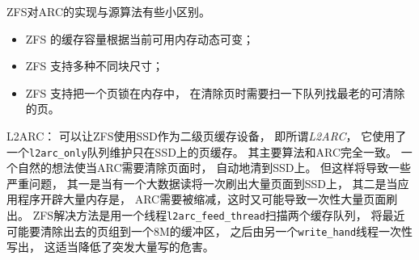 ZFS对ARC的实现与源算法有些小区别。
\begin{itemize}
  \item ZFS 的缓存容量根据当前可用内存动态可变；
  \item ZFS 支持多种不同块尺寸；
  \item ZFS 支持把一个页锁在内存中，
    在清除页时需要扫一下队列找最老的可清除的页。
\end{itemize}

L2ARC：
可以让ZFS使用SSD作为二级页缓存设备，
即所谓{\em L2ARC}，
它使用了一个\verb|l2arc_only|队列维护只在SSD上的页缓存。
其主要算法和ARC完全一致。
一个自然的想法使当ARC需要清除页面时，
自动地清到SSD上。
但这样将导致一些严重问题，
其一是当有一个大数据读将一次刷出大量页面到SSD上，
其二是当应用程序开辟大量内存是，
ARC需要被缩减，这时又可能导致一次性大量页面刷出。
ZFS解决方法是用一个线程\verb|l2arc_feed_thread|扫描两个缓存队列，
将最近可能要清除出去的页组到一个8M的缓冲区，
之后由另一个\verb|write_hand|线程一次性写出，
这适当降低了突发大量写的危害。
